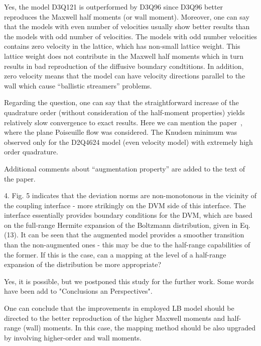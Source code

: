 \documentclass{article}
\begin{document}
Yes, the model D3Q121 is outperformed by D3Q96
since D3Q96 better reproduces the Maxwell half moments (or wall moment).
Moreover, one can say that the models with even number of velocities usually show better results
than the models with odd number of velocities.
The models with odd number velocities contains zero velocity in the lattice,
which has non-small lattice weight.
This lattice weight does not contribute in the Maxwell half moments
which in turn results in bad reproduction of the diffusive boundary condtitions.
In addition, zero velocity means that the model can have velocity directions parallel to the wall
which cause ``ballistic streamers'' problems.

Regarding the question, one can say that the straightforward increase of the quadrature order
(without consideration of the half-moment properties)
yields relatively slow convergence to exact results.
Here we can mention the paper~\cite{Meng2011accuracy},
where the plane Poiseuille flow was considered.
The Knudsen minimum was observed only for the D2Q4624 model (even velocity model)
with extremely high order quadrature.

Additional comments about ``augmentation property'' are added to the text of the paper.

\begin{quoting}
    4. Fig. 5 indicates that the deviation norms are
    non-monotonous in the vicinity of the coupling
    interface - more strikingly on the DVM side of this
    interface. The interface essentially provides boundary
    conditions for the DVM, which are based on the
    full-range Hermite expansion of the Boltzmann
    distribution, given in Eq. (13). It can be seen that
    the augmented model provides a smoother transition than
    the non-augmented ones - this may be due to the
    half-range capabilities of the former. If this is
    the case, can a mapping at the level of a half-range
    expansion of the distribution be more appropriate?
\end{quoting}

Yes, it is possible, but we postponed this study for the further work.
Some words have been add to "Conclusions an Perspectives".
\begin{leftbar}
    One can conclude that the improvements in employed LB model should be directed
    to the better reproduction of the higher Maxwell moments and half-range (wall) moments.
    In this case, the mapping method should be also upgraded by involving higher-order and wall moments.
\end{leftbar}
\end{document}
